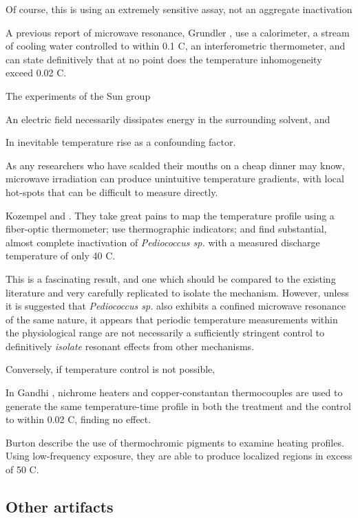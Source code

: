 \documentclass[paper.tex]{subfiles}
\begin{document}
Of course, this is using an extremely sensitive assay, not an aggregate inactivation 

A previous report of microwave resonance, Grundler \cite{Sharp1983}, use a calorimeter, a stream of cooling water controlled to within 0.1 C, an interferometric thermometer, and can state definitively that at no point does the temperature inhomogeneity exceed 0.02 C.

The experiments of the Sun group 

An electric field necessarily dissipates energy in the surrounding solvent, and 

In inevitable temperature rise as a confounding factor. 

As any researchers who have scalded their mouths on a cheap dinner may know, microwave irradiation can produce unintuitive temperature gradients, with local hot-spots that can be difficult to measure directly.

Kozempel \cite{Preliminary1997} and \cite{Inactivationa}. They take great pains to map the temperature profile using a fiber-optic thermometer; use thermographic indicators; and find substantial, almost complete inactivation of {\it Pediococcus sp.} with a measured discharge temperature of only 40 C.

This is a fascinating result, and one which should be compared to the existing literature and very carefully replicated to isolate the mechanism. However, unless it is suggested that {\it Pediococcus sp.} also exhibits a confined microwave resonance of the same nature, it appears that periodic temperature measurements within the physiological range are not necessarily a sufficiently stringent control to definitively {\it isolate} resonant effects from other mechanisms.

Conversely, if temperature control is not possible, 

In Gandhi \cite{Basic1983}, nichrome heaters and copper-constantan thermocouples are used to generate the same temperature-time profile in both the treatment and the control to within 0.02 C, finding no effect. 

Burton\cite{Effects1950} describe the use of thermochromic pigments to examine heating profiles. Using low-frequency exposure, they are able to produce localized regions in excess of 50 C.




\subsection{Other artifacts}
\end{document}
